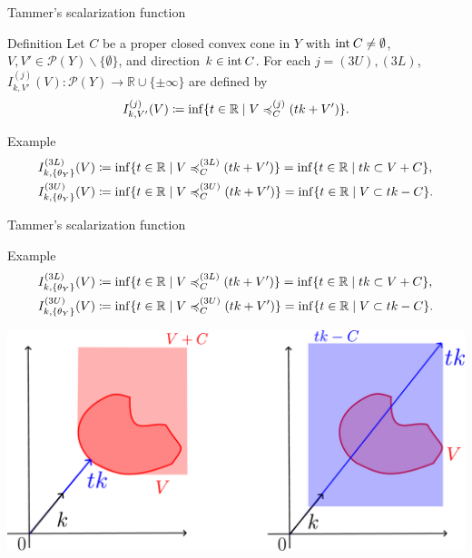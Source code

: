 \documentclass[aspectratio=169, dvipdfmx, 11pt]{beamer}
\newcommand{\RealNumberSet}{\mathbb{R}}
\newcommand{\Interior}[1]{\text{\rm int\:${#1}$}} %
\begin{document}
\begin{frame}{Tammer's scalarization function}
  \begin{block}{Definition}
    Let $C$ be a proper closed convex cone in $Y$ with $\Interior{C} \ne \emptyset$,
    $V, V' \in \mathcal{P}(Y) \backslash \{\emptyset\}$, and direction $k \in \Interior{C}$.
    For each $j = (3U), (3L)$, $I^{(j)}_{k, V'} (V) \colon \mathcal{P}(Y) \to \RealNumberSet \cup \{\pm \infty\}$
    are defined by
    \begin{equation}
      I^{(j)}_{k, V'} (V) \coloneq \inf\{ t \in \RealNumberSet \mid V \preccurlyeq_{C}^{(j)} (tk + V') \}. \notag
    \end{equation}
  \end{block}
  \begin{exampleblock}{Example}
    \begin{align}
      I^{(3L)}_{k, \{\theta_{Y}\}} (V) & \coloneq \inf\{ t \in \RealNumberSet \mid V \preccurlyeq_{C}^{(3L)} (tk + V') \}
      = \inf\{ t \in \RealNumberSet \mid tk \subset V + C \}, \notag                                                      \\
      I^{(3U)}_{k, \{\theta_{Y}\}} (V) & \coloneq \inf\{ t \in \RealNumberSet \mid V \preccurlyeq_{C}^{(3U)} (tk + V') \}
      = \inf\{ t \in \RealNumberSet \mid V \subset tk - C \}. \notag
    \end{align}
  \end{exampleblock}
\end{frame}

\begin{frame}{Tammer's scalarization function}
  \begin{exampleblock}{Example}
    \begin{align}
      I^{(3L)}_{k, \{\theta_{Y}\}} (V) & \coloneq \inf\{ t \in \RealNumberSet \mid V \preccurlyeq_{C}^{(3L)} (tk + V') \}
      = \inf\{ t \in \RealNumberSet \mid tk \subset V + C \}, \notag                                                      \\
      I^{(3U)}_{k, \{\theta_{Y}\}} (V) & \coloneq \inf\{ t \in \RealNumberSet \mid V \preccurlyeq_{C}^{(3U)} (tk + V') \}
      = \inf\{ t \in \RealNumberSet \mid V \subset tk - C \}. \notag
    \end{align}
  \end{exampleblock}
  \centering
  \includegraphics[keepaspectratio, scale=0.10]{figures/eps/tammar_scalarization_example.eps}
\end{frame}
\end{document}
